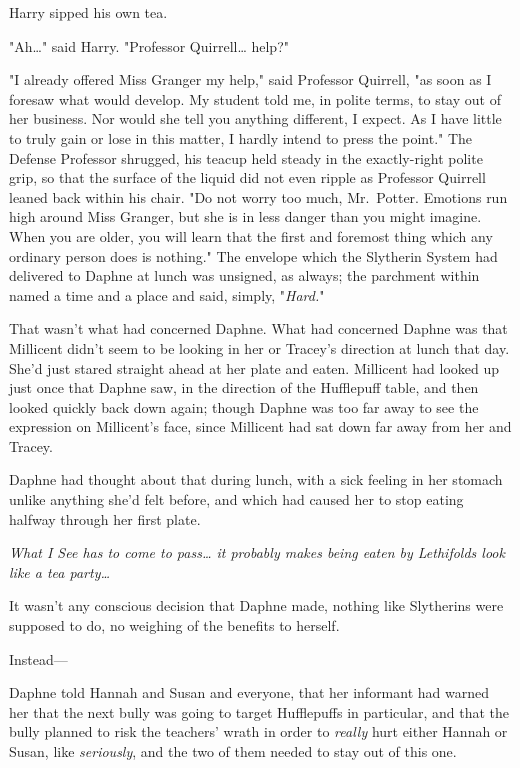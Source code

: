Harry sipped his own tea.

"Ah{\ldots}" said Harry. "Professor Quirrell{\ldots} help?"

"I already offered Miss Granger my help," said Professor Quirrell, "as soon as 
I foresaw what would develop. My student told me, in polite terms, to stay out 
of her business. Nor would she tell you anything different, I expect. As I have 
little to truly gain or lose in this matter, I hardly intend to press the 
point." The Defense Professor shrugged, his teacup held steady in the 
exactly-right polite grip, so that the surface of the liquid did not even 
ripple as Professor Quirrell leaned back within his chair. "Do not worry too 
much, Mr.~Potter. Emotions run high around Miss Granger, but she is in less 
danger than you might imagine. When you are older, you will learn that the 
first and foremost thing which any ordinary person does is nothing."
\sbreak
The envelope which the Slytherin System had delivered to Daphne at lunch was 
unsigned, as always; the parchment within named a time and a place and said, 
simply, "\emph{Hard.}"

That wasn't what had concerned Daphne. What had concerned Daphne was that 
Millicent didn't seem to be looking in her or Tracey's direction at lunch that 
day. She'd just stared straight ahead at her plate and eaten. Millicent had 
looked up just once that Daphne saw, in the direction of the Hufflepuff table, 
and then looked quickly back down again; though Daphne was too far away to see 
the expression on Millicent's face, since Millicent had sat down far away from 
her and Tracey.

Daphne had thought about that during lunch, with a sick feeling in her stomach 
unlike anything she'd felt before, and which had caused her to stop eating 
halfway through her first plate.

\emph{What I See has to come to pass{\ldots} it probably makes being eaten by 
Lethifolds look like a tea party{\ldots}}

It wasn't any conscious decision that Daphne made, nothing like Slytherins were 
supposed to do, no weighing of the benefits to herself.

Instead---

Daphne told Hannah and Susan and everyone, that her informant had warned her 
that the next bully was going to target Hufflepuffs in particular, and that the 
bully planned to risk the teachers' wrath in order to \emph{really} hurt either 
Hannah or Susan, like \emph{seriously}, and the two of them needed to stay out 
of this one.

